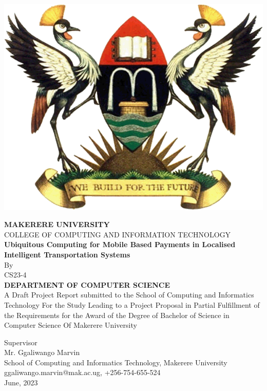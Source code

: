 \documentclass[14pt]{report}
\begin{document}
    \begin{titlepage}
        \begin{center}
            \includegraphics[scale=0.25]{images/muk}

            \textbf{MAKERERE UNIVERSITY}
            \\COLLEGE OF COMPUTING AND INFORMATION TECHNOLOGY
            \vspace{1cm}
            \\{\textbf{ Ubiquitous Computing for Mobile Based Payments in Localised Intelligent Transportation Systems}}
            \vspace{0.5cm}
            \\By
            \\CS23-4
            \vspace{0.5cm}
            \\{\textbf{
                DEPARTMENT OF COMPUTER SCIENCE
            }}
            \vspace{0.5cm}
            \\A Draft Project Report submitted to the School of Computing and Informatics Technology
            For the Study Leading to a Project Proposal in Partial Fulfillment of the
            Requirements for the Award of the Degree of Bachelor of Science in Computer Science
            Of Makerere University
            \vspace{0.5cm}

            Supervisor
            \vspace{0.2cm}
            \\Mr. Ggaliwango Marvin
            \vspace{0.2cm}
            \\School of Computing and Informatics Technology, Makerere University
            \\ggaliwango.marvin@mak.ac.ug, +256-754-655-524
            \\June, 2023
        \end{center}
    \end{titlepage}
\end{document}
